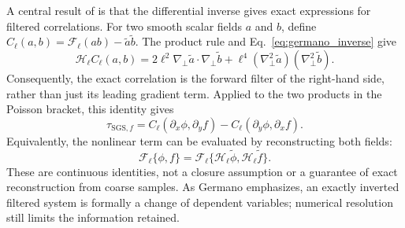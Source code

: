 \documentclass[authoryear,preprint,review,12pt]{elsarticle}
\begin{document}
A central result of \citet{germano_differential_1986} is that the differential inverse gives exact expressions for filtered correlations. For two smooth scalar fields $a$ and $b$, define $C_\ell(a,b)=\mathcal{F}_\ell(ab)-\widetilde a\widetilde b$. The product rule and Eq.~\eqref{eq:germano_inverse} give
\begin{equation}
    \mathcal{H}_\ell C_\ell(a,b)
    =2\ell^2\nabla_\perp\widetilde a\cdot\nabla_\perp\widetilde b
     +\ell^4(\nabla_\perp^2\widetilde a)(\nabla_\perp^2\widetilde b).
    \label{eq:germano_correlation}
\end{equation}
Consequently, the exact correlation is the forward filter of the right-hand side, rather than just its leading gradient term. Applied to the two products in the Poisson bracket, this identity gives
\begin{equation}
    \tau_{\mathrm{SGS},f}
    =C_\ell(\partial_x\phi,\partial_y f)
     -C_\ell(\partial_y\phi,\partial_x f).
\end{equation}
Equivalently, the nonlinear term can be evaluated by reconstructing both fields:
\begin{equation}
    \mathcal{F}_\ell\{\phi,f\}
    =\mathcal{F}_\ell\{
       \mathcal{H}_\ell\widetilde\phi,
       \mathcal{H}_\ell\widetilde f\}.
    \label{eq:germano_bracket_inverse}
\end{equation}
These are continuous identities, not a closure assumption or a guarantee of exact reconstruction from coarse samples. As Germano emphasizes, an exactly inverted filtered system is formally a change of dependent variables; numerical resolution still limits the information retained.
\end{document}

